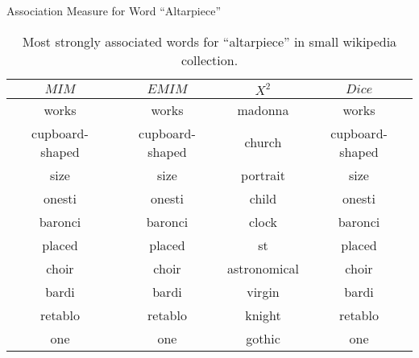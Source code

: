 \begin{table}[!htbp]
	\caption{Association Measure for Word ``Altarpiece''} \label{tab:altarpiece}
	\begin{center}
	\vspace{-5mm}
		\begin{tabular}{ c | c | c | c }
			\toprule
			$MIM$ & $EMIM$ & $X^2$ & $Dice$\\
			\midrule
			works      &    works  &        madonna     &    works          \\
			cupboard-shaped & cupboard-shaped & church   &  cupboard-shaped\\
			size      &     size     &      portrait     &  size           \\
			onesti    &     onesti   &      child        &  onesti         \\
			baronci   &     baronci  &      clock        &  baronci        \\
			placed    &     placed   &      st           &  placed         \\
			choir     &     choir    &      astronomical &  choir          \\
			bardi     &     bardi    &      virgin   &      bardi          \\
			retablo   &     retablo  &      knight   &      retablo        \\
			one       &     one & gothic &        one    \\
			\bottomrule
		\end{tabular}
	\caption*{\scriptsize Most strongly associated words for ``altarpiece'' in small wikipedia collection.}
	 \end{center}
\end{table}

